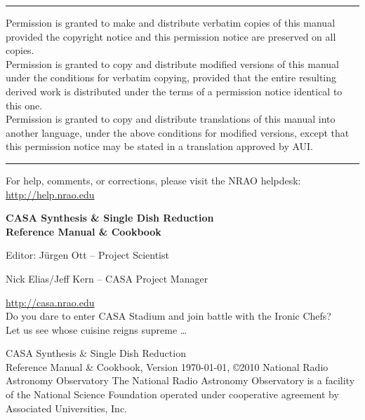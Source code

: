 \pagestyle{empty}

\small
\hrule
\vspace{2mm}
\noindent Permission is granted to make and distribute verbatim
copies of this manual provided the copyright notice and this
permission notice are preserved on all copies. \\
\noindent Permission is granted to copy and distribute modified versions of this
manual under the conditions for verbatim copying, provided that the
entire resulting derived work is distributed under the terms of a
permission notice identical to this one. \\
\noindent Permission is granted to copy and distribute translations of
this manual into another language, under the above conditions for
modified versions, except that this permission notice may be stated in
a translation approved by AUI.\\
\hrule
\vspace{2mm}
\normalsize
\vfill
\noindent For help, comments, or corrections, please visit the NRAO helpdesk:\\ \url{http://help.nrao.edu}
\normalsize

\pagebreak


\begin{center}
\LARGE
{\bf CASA Synthesis \& Single Dish Reduction\\ Reference Manual \& Cookbook} 

\vspace{3cm}



\Large
{Editor: J\"urgen Ott -- Project Scientist}

\vspace{1cm}

{Nick Elias/Jeff Kern -- CASA Project Manager}

\normalsize
\vspace{3cm}
{\Large \url{http://casa.nrao.edu}}\\
\vspace{2cm}
{\Large Do you dare to enter CASA Stadium and join battle with the Ironic Chefs?\\
Let us see whose cuisine reigns supreme \ldots}
\end{center}
\vfill


\begin{center}
{\sc CASA Synthesis \& Single Dish Reduction\\ Reference Manual \& Cookbook}, 
\break
Version \today,
\break
\copyright 2010 National Radio Astronomy Observatory
\break
\break
The National Radio Astronomy Observatory is a facility of the National
Science Foundation operated under cooperative agreement by Associated
Universities, Inc.\\[1cm]
\end{center}

